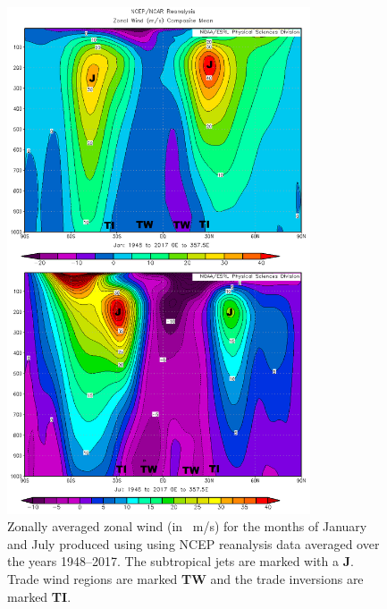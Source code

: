 \documentclass[11pt]{article}
\begin{document}
\begin{figure}[h!]
  \centering
  \includegraphics[width=0.8\textwidth]{zonal_wind_janjul.png}
  \caption{Zonally averaged zonal wind (in \SI{}{\m/\s}) for the months of January and July produced using using NCEP reanalysis data averaged over the years 1948--2017. The subtropical jets are marked with a \textbf{J}. Trade wind regions are marked \textbf{TW} and the trade inversions are marked \textbf{TI}.}
  \label{fig:zonal_wind}
\end{figure}
\end{document}
